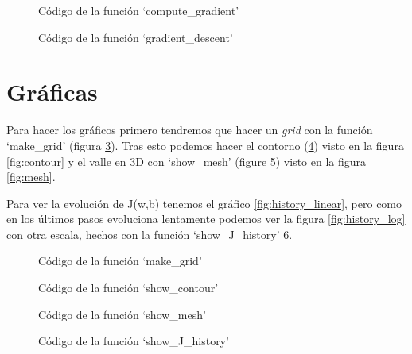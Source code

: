 \documentclass[6pt]{AiTex}
\begin{document}
\begin{figure}[H]
    \centering
    
    \caption{Código de la función `compute\_gradient'}
    \label{fig:compute_gradient}
\end{figure}

\begin{figure}[H]
    \centering
    
    \caption{Código de la función `gradient\_descent'}
    \label{fig:gradient_descent}
\end{figure}

\section{Gráficas}

Para hacer los gráficos primero tendremos que hacer un \textit{grid} con la función `make\_grid' (figura \ref{fig:make_grid}). Tras esto podemos hacer el contorno (\ref{fig:show_contour}) visto en la figura \ref{fig:contour} y el valle en 3D con `show\_mesh' (figure \ref{fig:show_mesh}) visto en la figura \ref{fig:mesh}.

Para ver la evolución de J(w,b) tenemos el gráfico \ref{fig:history_linear}, pero como en los últimos pasos evoluciona lentamente podemos ver la figura \ref{fig:history_log} con otra escala, hechos con la función `show\_J\_history' \ref{fig:show_J_history}.

\begin{figure}[H]
    \centering
    
    \caption{Código de la función `make\_grid'}
    \label{fig:make_grid}
\end{figure}

\begin{figure}[H]
    \centering
    
    \caption{Código de la función `show\_contour'}
    \label{fig:show_contour}
\end{figure}

\begin{figure}[H]
    \centering
    
    \caption{Código de la función `show\_mesh'}
    \label{fig:show_mesh}
\end{figure}

\begin{figure}[H]
    \centering
    
    \caption{Código de la función `show\_J\_history'}
    \label{fig:show_J_history}
\end{figure}
\end{document}
